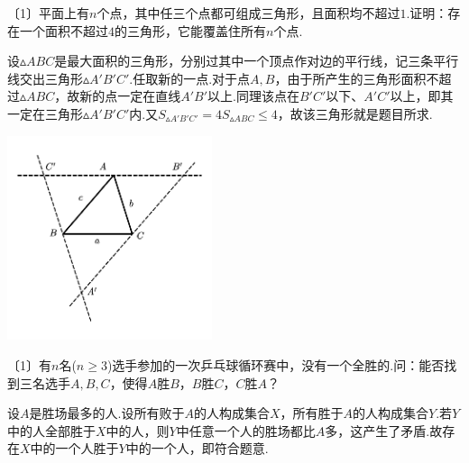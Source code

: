\documentclass[cn,hazy,black,10pt,normal]{elegantnote}
\newcommand{\nd}[1]{〔#1〕}
\begin{document}
\begin{problem} %
	\nd{1}平面上有$n$个点，其中任三个点都可组成三角形，且面积均不超过$1$.证明：存在一个面积不超过$4$的三角形，它能覆盖住所有$n$个点.
\end{problem}
\begin{solution}
	设$\vartriangle ABC$是最大面积的三角形，分别过其中一个顶点作对边的平行线，记三条平行线交出三角形$\vartriangle A'B'C'$.任取新的一点.对于点$A,B$，由于所产生的三角形面积不超过$\vartriangle ABC$，故新的点一定在直线$A'B'$以上.同理该点在$B'C'$以下、$A'C'$以上，即其一定在三角形$\vartriangle A'B'C'$内.又$S_{\vartriangle A'B'C'} = 4S_{\vartriangle ABC} \leq 4$，故该三角形就是题目所求.
	\begin{center}
		\includegraphics[width=6cm]{attachment/202302071.pdf}
	\end{center}
\end{solution}

\begin{problem} %
	\nd{1}有$n$名($n \geq 3$)选手参加的一次乒乓球循环赛中，没有一个全胜的.问：能否找到三名选手$A,B,C$，使得$A$胜$B$，$B$胜$C$，$C$胜$A$？
\end{problem}
\begin{solution}
	设$A$是胜场最多的人.设所有败于$A$的人构成集合$X$，所有胜于$A$的人构成集合$Y$.若$Y$中的人全部胜于$X$中的人，则$Y$中任意一个人的胜场都比$A$多，这产生了矛盾.故存在$X$中的一个人胜于$Y$中的一个人，即符合题意.
\end{solution}
\end{document}
